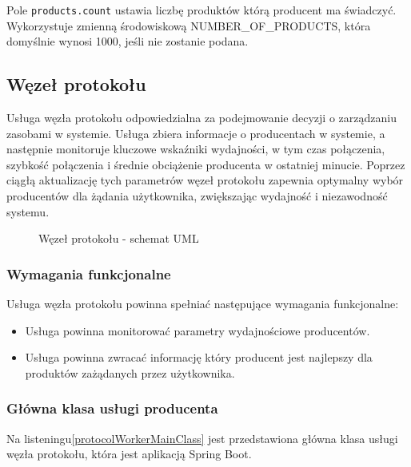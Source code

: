 Pole \verb|products.count| ustawia liczbę produktów którą producent ma świadczyć. Wykorzystuje zmienną środowiskową NUMBER\_OF\_PRODUCTS, która domyślnie wynosi 1000, jeśli nie zostanie podana.

\subsection{Węzeł protokołu}

Usługa węzła protokołu odpowiedzialna za podejmowanie decyzji o zarządzaniu zasobami w systemie. Usługa zbiera informacje o producentach w systemie, a następnie monitoruje kluczowe wskaźniki wydajności, w tym czas połączenia, szybkość połączenia i średnie obciążenie producenta w ostatniej minucie. Poprzez ciągłą aktualizację tych parametrów węzeł protokołu zapewnia optymalny wybór producentów dla żądania użytkownika, zwiększając wydajność i niezawodność systemu.

\begin{figure}[!htbp]
    \centering
    
    \caption{Węzeł protokołu - schemat UML}
    \label{ProducerUML}
\end{figure}

\subsubsection{Wymagania funkcjonalne}

Usługa węzła protokołu powinna spełniać następujące wymagania funkcjonalne:

\begin{itemize}
    \item Usługa powinna monitorować parametry wydajnościowe producentów.
    \item Usługa powinna zwracać informację który producent jest najlepszy dla produktów zażądanych przez użytkownika.
\end{itemize}

\subsubsection{Główna klasa usługi producenta}

Na listeningu\ref{protocolWorkerMainClass} jest przedstawiona główna klasa usługi węzła protokołu, która jest aplikacją Spring Boot.

